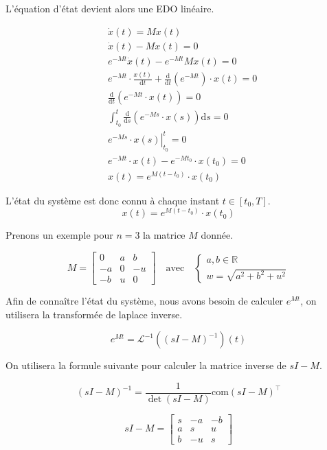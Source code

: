 \documentclass[
  french,
]{article}
\begin{document}
L'équation d'état devient alors une EDO linéaire.

\begin{align}
&    \dot{x}(t)= Mx(t)\\
&    \dot{x}(t)- Mx(t)= 0 \\
&    e^{-Mt}\dot{x}(t)- e^{-Mt} Mx(t)= 0 \\
&    e^{-Mt}\cdot\frac{x(t)}{\mathrm{d}t} + \frac{\mathrm{d}}{\mathrm{d}t}\left(e^{-Mt}\right)\cdot x(t)= 0 \\
&    \frac{\mathrm{d}}{\mathrm{d}t}\left(e^{-Mt}\cdot x(t)\right) = 0\\
&    \int_{t_0}^t\frac{\mathrm{d}}{\mathrm{d}s}\left(e^{-Ms}\cdot x(s)\right)\mathrm{d}s= 0\\
&    \left. e^{-Ms}\cdot x(s)\right\rvert_{t_0}^t = 0\\
&    e^{-Mt}\cdot x(t)- e^{-Mt_0}\cdot x(t_0) = 0\\
&    x(t)= e^{M\left(t-t_0\right)}\cdot x(t_0)
\end{align}

L'état du système est donc connu à chaque instant \(t\in[t_0,T]\).
\[\boxed{x(t)= e^{M\left(t-t_0\right)}\cdot x(t_0)}\]

Prenons un exemple pour \(n=3\) la matrice \(M\) donnée.

\[M = \left[\begin{matrix}0 & a & b\\- a & 0 & - u\\- b & u & 0\end{matrix}\right]\quad\text{avec}\quad\begin{cases}
    a,b\in\mathbb{R}\\
    w = \sqrt{a^2+b^2+u^2}
\end{cases}\]

Afin de connaître l'état du système, nous avons besoin
de calculer \(e^{Mt}\), on utilisera la transformée
de laplace inverse.

\[e^{Mt} = \mathcal{L}^{-1}\left(\left(sI-M\right)^{-1}\right)(t)\]

On utilisera la formule suivante pour calculer
la matrice inverse de \(sI-M\).

\[(sI-M)^{-1} = \frac{1}{\det(sI-M)}
    {\mathrm{com}(sI-M)}^{\top}\]

\[sI-M = \left[\begin{matrix}s & - a & - b\\a & s & u\\b & - u & s\end{matrix}\right]\]
\end{document}
